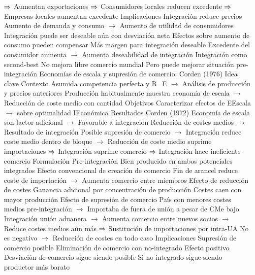 \documentclass{nuevotema}
\begin{document}
\begin{esquemal}
				\4[] $\Rightarrow$ Aumentan exportaciones
				\4[] $\Rightarrow$ Consumidores locales reducen excedente
				\4[] $\Rightarrow$ Empresas locales aumentan excedente
				\4 
			\3 Implicaciones
				\4 Integración reduce precios
				\4[] Aumento de demanda y consumo
				\4[] $\to$ Aumento de utilidad de consumidores
				\4 Integración puede ser deseable aún con desviación neta
				\4[] Efectos sobre aumento de consumo pueden compensar
				\4 Más margen para integración deseable
				\4[] Excedente del consumidor aumenta
				\4[] $\to$ Aumenta deseabilidad de integración
				\4 Integración como second-best
				\4[] No mejora libre comercio mundial
				\4[] Pero puede mejorar situación pre-integración
		\2 Economías de escala y supresión de comercio: Corden (1976)
			\3 Idea clave
				\4 Contexto
				\4[] Asumida competencia perfecta y R=E
				\4[] $\to$ Análisis de producción y precios anteriores
				\4[] Producción habitualmente muestra economía de escala
				\4[] $\to$ Reducción de coste medio con cantidad
				\4 Objetivos
				\4[] Caracterizar efectos de EEscala
				\4[] $\to$ sobre optimalidad IEconómica
				\4 Resultados
				\4[] Corden (1972)
				\4[] Economía de escala son factor adicional
				\4[] $\to$ Favorable a integración
				\4[] Reducción de costes medios
				\4[] $\to$ Resultado de integración
				\4[] Posible supresión de comercio
				\4[] $\to$ Integración reduce coste medio dentro de bloque
				\4[] $\to$ Reducción de coste medio suprime importaciones
				\4[] $\Rightarrow$ Integración suprime comercio
				\4[] $\Rightarrow$ Integración hace ineficiente comercio
			\3 Formulación
				\4 Pre-integración
				\4[] Bien producido en ambos potenciales integrados
				\4 Efecto convencional de creación de comercio
				\4[] Fin de arancel reduce coste de importación
				\4[] $\to$ Aumenta comercio entre miembros
				\4 Efecto de reducción de costes
				\4[] Ganancia adicional por concentración de producción
				\4[] Costes caen con mayor producción
				\4 Efecto de supresión de comercio
				\4[] País con menores costes medios pre-integración
				\4[] $\to$ Importaba de fuera de unión a pesar de CMe bajo
				\4[] Integración unión aduanera
				\4[] $\to$ Aumenta comercio entre nuevos socios
				\4[] $\to$ Reduce costes medios aún más
				\4[] $\Rightarrow$ Sustitución de importaciones por intra-UA
				\4[] No es negativo
				\4[] $\to$ Reducción de costes en todo caso
			\3 Implicaciones
				\4 Supresión de comercio posible
				\4[] Eliminación de comercio con no-integrado
				\4[] Efecto positivo
				\4 Desviación de comercio sigue siendo posible
				\4[] Si no integrado sigue siendo productor más barato

\end{esquemal}
\end{document}
